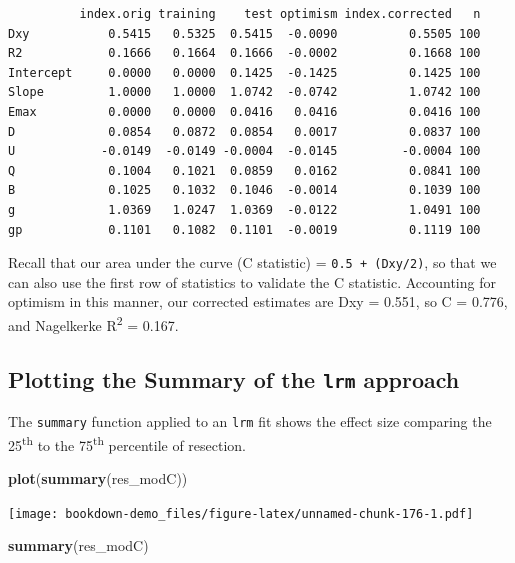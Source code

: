 \documentclass[]{book}
\newenvironment{Shaded}{\begin{snugshade}}{\end{snugshade}}
\newcommand{\KeywordTok}[1]{\textcolor[rgb]{0.13,0.29,0.53}{\textbf{#1}}}
\newcommand{\NormalTok}[1]{#1}
\theoremstyle{definition}
\theoremstyle{definition}
\theoremstyle{definition}
\theoremstyle{remark}
\begin{document}
\begin{verbatim}
          index.orig training    test optimism index.corrected   n
Dxy           0.5415   0.5325  0.5415  -0.0090          0.5505 100
R2            0.1666   0.1664  0.1666  -0.0002          0.1668 100
Intercept     0.0000   0.0000  0.1425  -0.1425          0.1425 100
Slope         1.0000   1.0000  1.0742  -0.0742          1.0742 100
Emax          0.0000   0.0000  0.0416   0.0416          0.0416 100
D             0.0854   0.0872  0.0854   0.0017          0.0837 100
U            -0.0149  -0.0149 -0.0004  -0.0145         -0.0004 100
Q             0.1004   0.1021  0.0859   0.0162          0.0841 100
B             0.1025   0.1032  0.1046  -0.0014          0.1039 100
g             1.0369   1.0247  1.0369  -0.0122          1.0491 100
gp            0.1101   0.1082  0.1101  -0.0019          0.1119 100
\end{verbatim}

Recall that our area under the curve (C statistic) =
\texttt{0.5\ +\ (Dxy/2)}, so that we can also use the first row of
statistics to validate the C statistic. Accounting for optimism in this
manner, our corrected estimates are Dxy = 0.551, so C = 0.776, and
Nagelkerke R\textsuperscript{2} = 0.167.

\subsection{\texorpdfstring{Plotting the Summary of the \texttt{lrm}
approach}{Plotting the Summary of the lrm approach}}\label{plotting-the-summary-of-the-lrm-approach}

The \texttt{summary} function applied to an \texttt{lrm} fit shows the
effect size comparing the 25\textsuperscript{th} to the
75\textsuperscript{th} percentile of resection.

\begin{Shaded}
\begin{Highlighting}[]
\KeywordTok{plot}\NormalTok{(}\KeywordTok{summary}\NormalTok{(res_modC))}
\end{Highlighting}
\end{Shaded}

\texttt{[image: bookdown-demo\_files/figure-latex/unnamed-chunk-176-1.pdf]}

\begin{Shaded}
\begin{Highlighting}[]
\KeywordTok{summary}\NormalTok{(res_modC)}
\end{Highlighting}
\end{Shaded}
\end{document}
